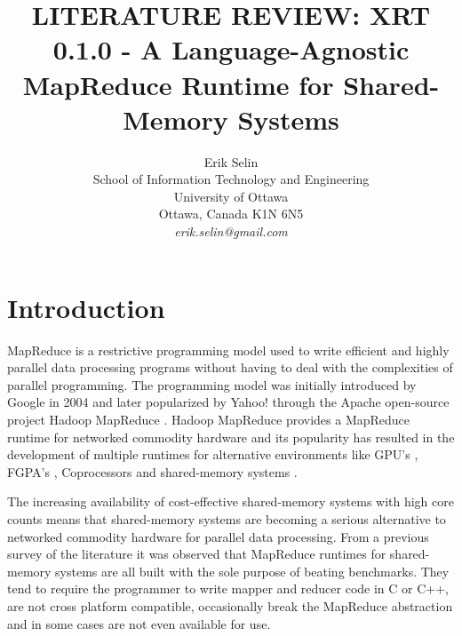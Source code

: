 \documentclass[11pt]{article}       %
\begin{document}


\title{LITERATURE REVIEW: XRT 0.1.0 - A Language-Agnostic MapReduce Runtime for
Shared-Memory Systems}


\author{
Erik Selin\\
School of Information Technology and Engineering\\
University of Ottawa\\
Ottawa, Canada K1N 6N5 \\
{\em erik.selin@gmail.com}
} %

\maketitle

\section{Introduction} \label{intro}

MapReduce is a restrictive programming model used to write efficient and highly
parallel data processing programs without having to deal with the complexities
of parallel programming. The programming model was initially introduced by
Google in 2004 \cite{GoogleMapReduce} and later popularized by Yahoo! through
the Apache open-source project Hadoop MapReduce \cite{Hadoop}. Hadoop MapReduce
provides a MapReduce runtime for networked commodity hardware and its popularity
has resulted in the development of multiple runtimes for alternative
environments like GPU’s \cite{Mars}, FGPA's \cite{Melia}, Coprocessors
\cite{MrPhi} and shared-memory systems \cite{Phoenix} \cite{Phoenix++}
\cite{CilkMR} \cite{Metis} \cite{Ostrich}.

The increasing availability of cost-effective shared-memory systems with high
core counts \cite{AWS} \cite{GoogleCloud} means that shared-memory systems are
becoming a serious alternative to networked commodity hardware for parallel data
processing. From a previous survey of the literature it was observed that
MapReduce runtimes for shared-memory systems are all built with the sole purpose
of beating benchmarks. They tend to require the programmer to write mapper and
reducer code in C or C++, are not cross platform compatible, occasionally break
the MapReduce abstraction and in some cases are not even available for use.
\end{document}
